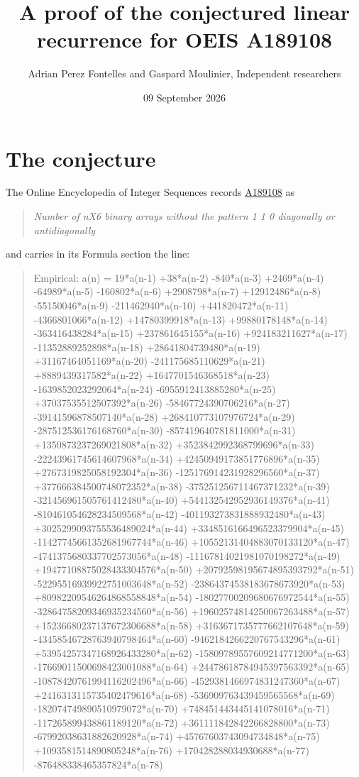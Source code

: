 \documentclass[11pt]{article}
\title{A proof of the conjectured linear recurrence for OEIS A189108}
\author{Adrian Perez Fontelles and Gaspard Moulinier, Independent researchers}
\date{09 September 2026}
\theoremstyle{definition}
\begin{document}
\maketitle
\section{The conjecture}

The Online Encyclopedia of Integer Sequences records \href{https://oeis.org/A189108}{A189108} as

\begin{quote}\itshape Number of nX6 binary arrays without the pattern 1 1 0 diagonally or antidiagonally\end{quote}

and carries in its Formula section the line:

\begin{quote}\ttfamily Empirical: a(n) = 19*a(n-1) +38*a(n-2) -840*a(n-3) +2469*a(n-4) -64989*a(n-5) -160802*a(n-6) +2908798*a(n-7) +12912486*a(n-8) -55150046*a(n-9) -211462940*a(n-10) +441820472*a(n-11) -4366801066*a(n-12) +14780399918*a(n-13) +99880178148*a(n-14) -363416438284*a(n-15) +237861645155*a(n-16) +924183211627*a(n-17) -11352889252898*a(n-18) +28641804739480*a(n-19) +31167464051169*a(n-20) -241175685110629*a(n-21) +8889439317582*a(n-22) +1647701546368518*a(n-23) -1639852023292064*a(n-24) -6955912413885280*a(n-25) +37037535512507392*a(n-26) -58467724390706216*a(n-27) -39141596878507140*a(n-28) +268410773107976724*a(n-29) -287512536176168760*a(n-30) -857419640781811000*a(n-31) +1350873237269021808*a(n-32) +3523842992368799696*a(n-33) -22243961745614607968*a(n-34) +42450949173851776896*a(n-35) +2767319825058192304*a(n-36) -125176914231928296560*a(n-37) +377666384500748072352*a(n-38) -375251256711467371232*a(n-39) -321456961505761412480*a(n-40) +544132542952936149376*a(n-41) -810461054628234509568*a(n-42) -401193273831888932480*a(n-43) +3025299093755536489024*a(n-44) +3348516166496523379904*a(n-45) -11427745661352681967744*a(n-46) +10552131404883070133120*a(n-47) -4741375680337702573056*a(n-48) -11167814021981070198272*a(n-49) +19477108875028433304576*a(n-50) +20792598195674895393792*a(n-51) -52295516939922751003648*a(n-52) -23864374538183678673920*a(n-53) +80982209546264868558848*a(n-54) -18027700209680676972544*a(n-55) -32864758209346935234560*a(n-56) +19602574814250067263488*a(n-57) +15236680237137672306688*a(n-58) +3163671735777662107648*a(n-59) -43458546728763940798464*a(n-60) -9462184266220767543296*a(n-61) +53954257347168926433280*a(n-62) -15809789557609214771200*a(n-63) -17669011500698423001088*a(n-64) +24478618784945397563392*a(n-65) -10878420761994116202496*a(n-66) -4529381466974831247360*a(n-67) +2416313115735402479616*a(n-68) -536909763439459565568*a(n-69) -182074749890510979072*a(n-70) +748451443445141078016*a(n-71) -117265899438861189120*a(n-72) +361111842842266828800*a(n-73) -67992038631882620928*a(n-74) +45767603743094734848*a(n-75) +1093581514890805248*a(n-76) +170428288034930688*a(n-77) -876488338465357824*a(n-78)\end{quote}
\end{document}
